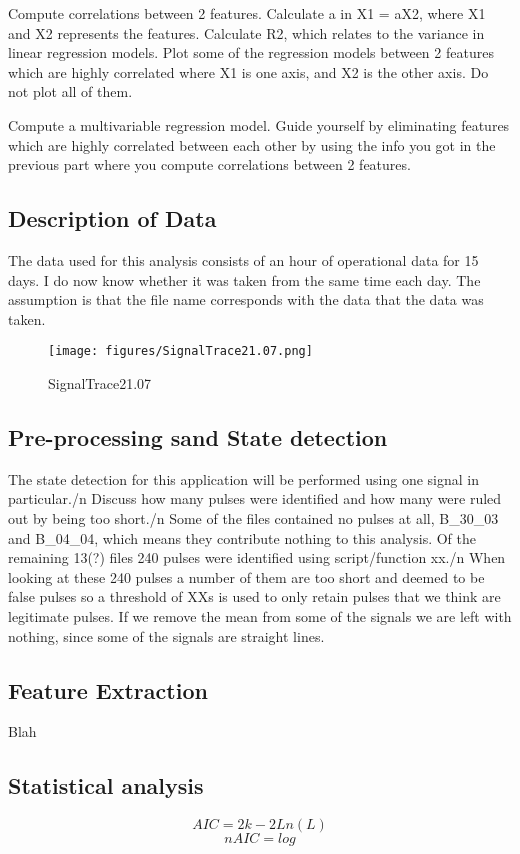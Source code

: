 \documentclass{article}
\begin{document}
Compute correlations between 2 features.
Calculate a in X1 = aX2, where X1 and X2 represents the features.
Calculate R2, which relates to the variance in linear regression models.
Plot some of the regression models between 2 features which are highly correlated where X1 is one axis, and X2 is the other axis. Do not plot all of them.

Compute a multivariable regression model.
Guide yourself by eliminating features which are highly correlated between each other by using the info you got in the previous part where you compute correlations between 2 features.

\subsection{Description of Data}
The data used for this analysis consists of an hour of operational data for 15 days. I do now know whether it was taken from the same time each day. The assumption is that the file name corresponds with the data that the data was taken.
\begin{figure}[!ht]
    \centering
    \texttt{[image: figures/SignalTrace21.07.png]}
    \caption{SignalTrace21.07}
    \label{fig:SignalTrace21.07}
\end{figure}
\subsection{Pre-processing sand State detection}
The state detection for this application will be performed using one signal in particular./n
Discuss how many pulses were identified and how many were ruled out by being too short./n
Some of the files contained no pulses at all, B\_30\_03 and B\_04\_04, which means they contribute nothing to this analysis.
Of the remaining 13(?) files 240 pulses were identified using script/function xx./n
When looking at these 240 pulses a number of them are too short and deemed to be false pulses so a threshold of XXs is used to only retain pulses that we think are legitimate pulses.
If we remove the mean from some of the signals we are left with nothing, since some of the signals are straight lines.
\subsection{Feature Extraction}
Blah
\subsection{Statistical analysis}
$$ AIC = 2k - 2Ln(L) $$  
$$ nAIC = log $$
\end{document}
